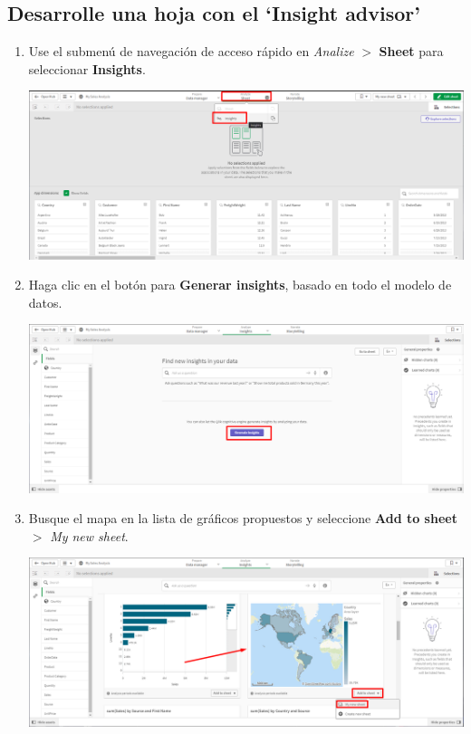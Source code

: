 \documentclass[12pt,letterpaper]{article}
\newcommand\tab[1][1cm]{\hspace*{#1}}
\begin{document}
    \subsection{Desarrolle una hoja con el ‘Insight advisor’}
    \begin{enumerate}[\tab 1.]
        \item Use el submenú de navegación de acceso rápido en \textit{Analize} $>$ \textbf{Sheet} para seleccionar \textbf{Insights}.
        \begin{center}
            \includegraphics[width=13cm]{./img/img7.png}
        \end{center}
        \item Haga clic en el botón para \textbf{Generar insights}, basado en todo el modelo de datos.
        \begin{center}
            \includegraphics[width=13cm]{./img/img8.png}
        \end{center}
        \item Busque el mapa en la lista de gráficos propuestos y seleccione \textbf{Add to sheet} $>$ \textit{My new sheet}.
        \begin{center}
            \includegraphics[width=13cm]{./img/img9.png}

\end{center}
\end{enumerate}
\end{document}
